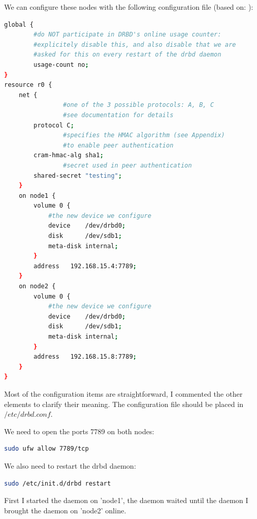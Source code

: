 \documentclass[12pt]{report}
\begin{document}
We can configure these nodes with the following configuration file
(based on: \cite{drbd_ubuntu_doc} \cite{drbd_official_doc}):
\begin{lstlisting}[language=bash]
global {
       	#do NOT participate in DRBD's online usage counter:
       	#explicitely disable this, and also disable that we are
       	#asked for this on every restart of the drbd daemon
       	usage-count no;
}
resource r0 {
	net {
                #one of the 3 possible protocols: A, B, C
                #see documentation for details
		protocol C;
                #specifies the HMAC algorithm (see Appendix)
                #to enable peer authentication
		cram-hmac-alg sha1;
                #secret used in peer authentication
		shared-secret "testing";
	}
	on node1 {
		volume 0 {
			#the new device we configure
			device    /dev/drbd0;
			disk      /dev/sdb1;
			meta-disk internal;
		}
		address   192.168.15.4:7789;
	}
	on node2 {
		volume 0 {
			#the new device we configure
			device    /dev/drbd0;
			disk      /dev/sdb1;
			meta-disk internal;
		}
		address   192.168.15.8:7789;
	}
}
\end{lstlisting}
Most of the configuration items are straightforward, I commented the
other elements to clarify their meaning.
The configuration file should be placed in $/etc/drbd.conf$.

We need to open the ports 7789 on both nodes:
\begin{lstlisting}[language=bash]
sudo ufw allow 7789/tcp
\end{lstlisting}

We also need to restart the drbd daemon: 
\begin{lstlisting}[language=bash]
sudo /etc/init.d/drbd restart
\end{lstlisting}

First I started the daemon on 'node1', the daemon waited until the
daemon I brought the daemon on 'node2' online.
\end{document}

